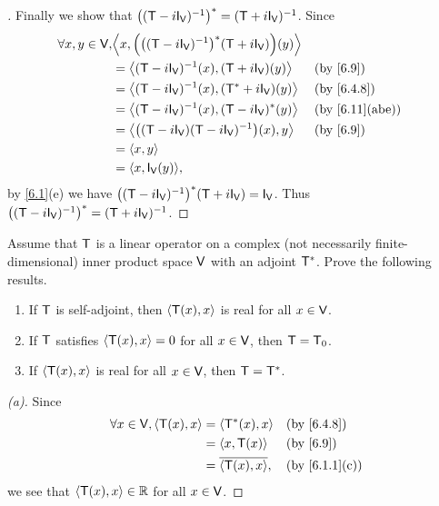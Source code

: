 \begin{proof}[]
	Finally we show that \(\pa{(\T - i \IT[\V])^{-1}}^* = (\T + i \IT[\V])^{-1}\).
	Since
	\begin{align*}
		\forall x, y \in \V, & \inn{x, \pa{\pa{(\T - i \IT[\V])^{-1}}^* (\T + i \IT[\V])}(y)}                     \\
		                     & = \inn{(\T - i \IT[\V])^{-1}(x), (\T + i \IT[\V])(y)}          &  & \by{6.9}       \\
		                     & = \inn{(\T - i \IT[\V])^{-1}(x), (\T^* + i \IT[\V])(y)}        &  & \by{6.4.8}     \\
		                     & = \inn{(\T - i \IT[\V])^{-1}(x), (\T - i \IT[\V])^*(y)}        &  & \by{6.11}[abe] \\
		                     & = \inn{\pa{(\T - i \IT[\V]) (\T - i \IT[\V])^{-1}}(x), y}      &  & \by{6.9}       \\
		                     & = \inn{x, y}                                                                       \\
		                     & = \inn{x, \IT[\V](y)},
	\end{align*}
	by \cref{6.1}(e) we have \(\pa{(\T - i \IT[\V])^{-1}}^* (\T + i \IT[\V]) = \IT[\V]\).
	Thus \(\pa{(\T - i \IT[\V])^{-1}}^* = (\T + i \IT[\V])^{-1}\).
\end{proof}

\begin{ex}\label{ex:6.4.11}
	Assume that \(\mathsf{T}\) is a linear operator on a complex (not necessarily finite-dimensional) inner product space \(\mathsf{V}\) with an adjoint \(\mathsf{T}^*\).
	Prove the following results.
	\begin{enumerate}
		\item If \(\mathsf{T}\) is self-adjoint, then \(\left\langle\mathsf{T}(x), x\right\rangle\) is real for all \(x \in \mathsf{V}\).
		\item If \(\mathsf{T}\) satisfies \(\left\langle\mathsf{T}(x), x\right\rangle = 0\) for all \(x \in \mathsf{V}\), then \(\mathsf{T} = \mathsf{T}_0\).
		\item If \(\left\langle\mathsf{T}(x), x\right\rangle\) is real for all \(x \in \mathsf{V}\), then \(\mathsf{T} = \mathsf{T}^*\).
	\end{enumerate}
\end{ex}

\begin{proof}[(a)]
	Since
	\begin{align*}
		\forall x \in \V, \inn{\T(x), x} & = \inn{\T^*(x), x}       &  & \by{6.4.8}    \\
		                                 & = \inn{x, \T(x)}         &  & \by{6.9}      \\
		                                 & = \conj{\inn{\T(x), x}}, &  & \by{6.1.1}[c]
	\end{align*}
	we see that \(\left\langle\mathsf{T}(x), x\right\rangle \in \mathbb{R}\) for all \(x \in \mathsf{V}\).
\end{proof}

